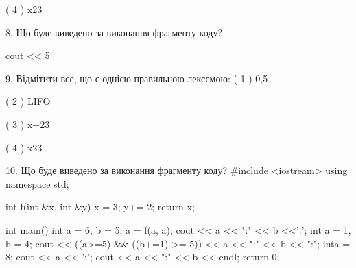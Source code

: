 \documentclass[11pt]{article}
\begin{document}
( 4 ) x23
\vspace{5mm}

8. Що буде виведено за виконання фрагменту коду?

cout << 5 %
\vspace{5mm}

9. %
Відмітити все, що є однією правильною лексемою:
( 1 ) 0,5

( 2 ) LIFO

( 3 ) x+23

( 4 ) x23
\vspace{5mm}

10. Що буде виведено за виконання фрагменту коду?
#include <iostream>
using namespace std;

int f(int &x, int &y){
    x = 3;
    y+= 2;
    return x;
}

int main(){
    int a = 6, b = 5;
    a = f(a, a);
    cout << a << ":" << b <<':';
    {
        int a = 1, b = 4;
        cout << ((a>=5) && ((b+=1) >= 5))
             << a << ":" << b << ":";
    }
    {
        inta = 8;
        cout << a << ':';
    }
    cout << a << ":" << b << endl;
    return 0;
}

\vspace{5mm}

\newpage
\end{document}
